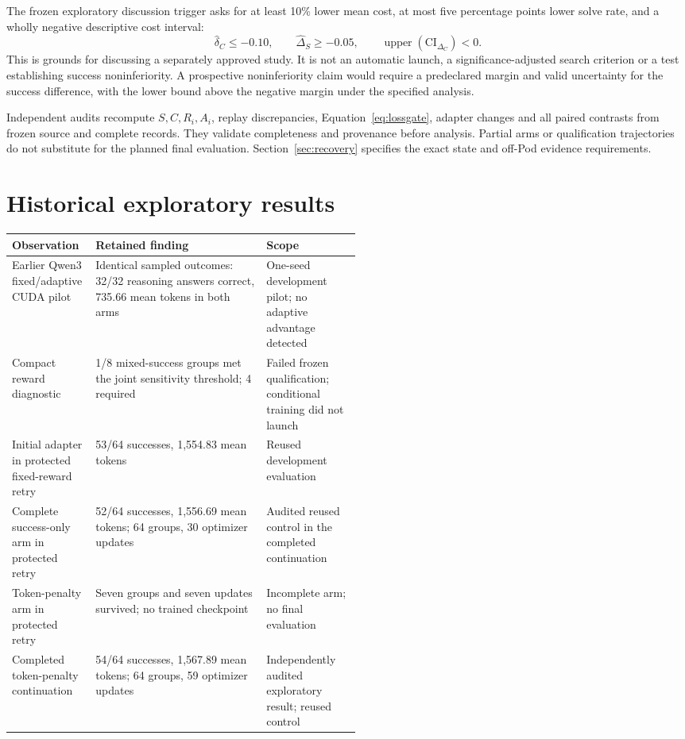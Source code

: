 \documentclass[11pt]{article}
\begin{document}
The frozen exploratory discussion trigger asks for at least 10\% lower mean cost, at most five percentage points lower solve rate, and a wholly negative descriptive cost interval:
\begin{equation}
 \widehat\delta_C\leq-0.10,\qquad
 \widehat\Delta_S\geq-0.05,\qquad
 \operatorname{upper}(\mathrm{CI}_{\Delta_C})<0.
\end{equation}
This is grounds for discussing a separately approved study. It is not an automatic launch, a significance-adjusted search criterion or a test establishing success noninferiority. A prospective noninferiority claim would require a predeclared margin and valid uncertainty for the success difference, with the lower bound above the negative margin under the specified analysis.

Independent audits recompute $S,C,R_i,A_i$, replay discrepancies, Equation~\eqref{eq:lossgate}, adapter changes and all paired contrasts from frozen source and complete records. They validate completeness and provenance before analysis. Partial arms or qualification trajectories do not substitute for the planned final evaluation. Section~\ref{sec:recovery} specifies the exact state and off-Pod evidence requirements.

\section{Historical exploratory results}

\begin{center}
\small
\renewcommand{\arraystretch}{1.2}
\begin{tabularx}{\linewidth}{@{}p{0.24\linewidth}Xp{0.27\linewidth}@{}}
\toprule
\textbf{Observation} & \textbf{Retained finding} & \textbf{Scope} \\
\midrule
Earlier Qwen3 fixed/adaptive CUDA pilot & Identical sampled outcomes: 32/32 reasoning answers correct, 735.66 mean tokens in both arms & One-seed development pilot; no adaptive advantage detected \\
Compact reward diagnostic & 1/8 mixed-success groups met the joint sensitivity threshold; 4 required & Failed frozen qualification; conditional training did not launch \\
Initial adapter in protected fixed-reward retry & 53/64 successes, 1,554.83 mean tokens & Reused development evaluation \\
Complete success-only arm in protected retry & 52/64 successes, 1,556.69 mean tokens; 64 groups, 30 optimizer updates & Audited reused control in the completed continuation \\
Token-penalty arm in protected retry & Seven groups and seven updates survived; no trained checkpoint & Incomplete arm; no final evaluation \\
Completed token-penalty continuation & 54/64 successes, 1,567.89 mean tokens; 64 groups, 59 optimizer updates & Independently audited exploratory result; reused control \\
\bottomrule
\end{tabularx}
\end{center}
\end{document}
